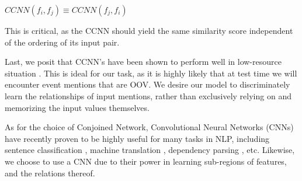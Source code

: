 \documentclass[11pt,a4paper]{article}
\begin{document}
\vspace{4mm}

 $CCNN(f_i,f_j) \equiv CCNN(f_j,f_i)$

\vspace{4mm}

This is critical, as the CCNN should yield the same similarity score independent of the ordering of its input pair.

Last, we posit that CCNN's have been shown to perform well in low-resource situation \cite{Koch2015SiameseNN}.  This is ideal for our task, as it is highly likely that at test time we will encounter event mentions that are OOV.  We desire our model to discriminately learn the relationships of input mentions, rather than exclusively relying on and memorizing the input values themselves.

As for the choice of Conjoined Network, Convolutional Neural Networks (CNNs) have recently proven to be highly useful for many tasks in NLP, including sentence classification \cite{DBLP:conf/emnlp/Kim14}, machine translation \cite{DBLP:conf/acl/GehringAGD17}, dependency parsing \cite{DBLP:journals/corr/YuV17}, etc.  Likewise, we choose to use a CNN due to their power in learning sub-regions of features, and the relations thereof.
\end{document}
